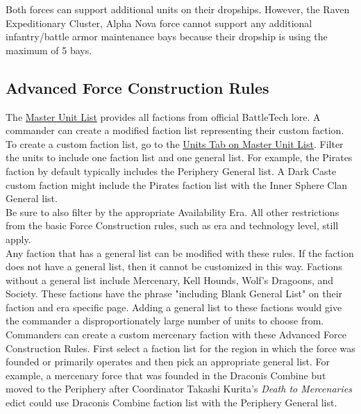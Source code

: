 \documentclass[UTF8]{article}
\begin{document}
Both forces can support additional units on their dropships.
However, the Raven Expeditionary Cluster, Alpha Nova force cannot support any additional infantry/battle armor maintenance bays because their dropship is using the maximum of 5 bays.\\

\newpage

\subsection{Advanced Force Construction Rules}

The \href{http://www.masterunitlist.info/}{Master Unit List} provides all factions from official BattleTech lore.
A commander can create a modified faction list representing their custom faction.\\

To create a custom faction list, go to the \href{http://www.masterunitlist.info/Unit/Filter}{Units Tab on Master Unit List}.
Filter the units to include one faction list and one general list.
For example, the Pirates faction by default typically includes the Periphery General list.
A Dark Caste custom faction might include the Pirates faction list with the Inner Sphere Clan General list.\\

Be sure to also filter by the appropriate Availability Era.
All other restrictions from the basic Force Construction rules, such as era and technology level, still apply.\\

Any faction that has a general list can be modified with these rules.
If the faction does not have a general list, then it cannot be customized in this way.
Factions without a general list include Mercenary, Kell Hounds, Wolf's Dragoons, and Society.
These factions have the phrase "including Blank General List" on their faction and era specific page.
Adding a general list to these factions would give the commander a disproportionately large number of units to choose from.\\

Commanders can create a custom mercenary faction with these Advanced Force Construction Rules.
First select a faction list for the region in which the force was founded or primarily operates and then pick an appropriate general list.
For example, a mercenary force that was founded in the Draconis Combine but moved to the Periphery after Coordinator Takashi Kurita's \emph{Death to Mercenaries} edict could use Draconis Combine faction list with the Periphery General list.\\
\end{document}
